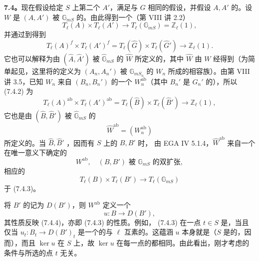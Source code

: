 \textbf{7.4。}现在假设给定 $S$ 上第二个 $A'$，满足与 $G$ 相同的假设，并假设 $A,A'$ 的。设 $W$ 是 $(A,A')$ 被 $\mathbb G_{mS}$ 的。由此得到一个（第 VIII 讲 2.2）
\begin{equation}\tag{7.4.1}
 T_\ell(A)\times T_\ell(A')\longrightarrow
 T_\ell(\mathbb G_{mS})=\mathbb Z_\ell(1),
\end{equation}
并通过到得到
\begin{equation}\tag{7.4.2}
 T_\ell(A)^f\times T_\ell(A')^f
 =T_\ell(\widehat G)\times T_\ell(\widehat G')\longrightarrow\mathbb Z_\ell(1).
\end{equation}
它也可以解释为由 $(\widehat A,\widehat A')$ 被 $\widehat{\mathbb G}_{mS}$ 的 $\widehat W$ 所定义的，其中 $\widehat W$ 由 $W$ 经得到（为简单起见，这里将的定义为 $(A_n,A_n')$ 被 $\mathbb G_{mS_n}$ 的 $W_n$ 所成的相容族）。由第 VIII 讲 3.5，已知 $W_n$ 来自 $(B_n,B_n')$ 的一个 $W_n^{\mathrm{ab}}$（其中 $B_n'$ 是 $G_n'$ 的），所以 (7.4.2) 为
\begin{equation}\tag{7.4.3}
 T_\ell(A)^{\mathrm{ab}}\times T_\ell(A')^{\mathrm{ab}}
 =T_\ell(\widehat B)\times T_\ell(\widehat B')\longrightarrow\mathbb Z_\ell(1),
\end{equation}
它也是由 $(\widehat B,\widehat B')$ 被 $\widehat{\mathbb G}_{mS}$ 的
\[
 \widehat W^{\mathrm{ab}}=(W_n^{\mathrm{ab}})
\]
所定义的。当 $\widehat B,\widehat B'$ ，因而有 $S$ 上的 $B,B'$ 时，
由 EGA IV 5.1.4，$\widehat W^{\mathrm{ab}}$ 来自一个在唯一意义下确定的
\[
 W^{\mathrm{ab}},\quad (B,B')\text{ 被 }\mathbb G_{mS}\text{ 的双扩张},
\]
相应的
\begin{equation}\tag{7.4.4}
 T_\ell(B)\times T_\ell(B')\longrightarrow T_\ell(\mathbb G_{mS})
\end{equation}
于 (7.4.3)。

将 $B'$ 的记为 $D(B')$，则 $W^{\mathrm{ab}}$ 定义一个
\begin{equation}\tag{7.4.5}
 u:B\longrightarrow D(B'),
\end{equation}
其性质反映 (7.4.4)，亦即 (7.4.3) 的性质。例如， (7.4.3) 在一点 $t\in S$ 是，当且仅当 $u_t:B_t\to D(B')_t$ 是一个的与 $\ell$ 互素的。这蕴涵 $u$ 本身就是（$S$ 是的，因而），而且 $\ker u$ 在 $S$ 上，故 $\ker u$ 在每一点的都相同。由此看出，刚才考虑的条件与所选的点 $t$ 无关。


